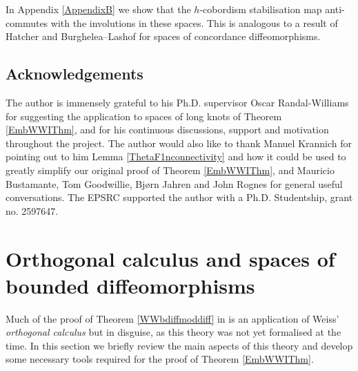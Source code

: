 \documentclass[a4paper, oneside]{amsart}
\newcommand{\1}{\mathds{1}}
\theoremstyle{remark}
\theoremstyle{definition}
\numberwithin{equation}{section}
\begin{document}
In Appendix \ref{AppendixB} we show that the $h$-cobordism stabilisation map anti-commutes with the involutions in these spaces. This is analogous to a result of Hatcher \cite[Appendix I, Lem.]{HatcherSSeq} and Burghelea--Lashof \cite[Cor. A7]{BurgLash} for spaces of concordance diffeomorphisms.





\subsection*{Acknowledgements}
The author is immensely grateful to his Ph.D. supervisor Oscar Randal-Williams for suggesting the application to spaces of long knots of Theorem \ref{EmbWWIThm}, and for his continuous discussions, support and motivation throughout the project. The author would also like to thank Manuel Krannich for pointing out to him Lemma \ref{ThetaF1nconnectivity} and how it could be used to greatly simplify our original proof of Theorem \ref{EmbWWIThm}, and Mauricio Bustamante, Tom Goodwillie, Bjørn Jahren and John Rognes for general useful conversations. The EPSRC supported the author with a Ph.D. Studentship, grant no. 2597647.







\section{Orthogonal calculus and spaces of bounded diffeomorphisms}\label{section2}
Much of the proof of Theorem \ref{WWbdiffmoddiff} in \cite{WWI} is an application of Weiss' \textit{orthogonal calculus} but in disguise, as this theory was not yet formalised at the time. In this section we briefly review the main aspects of this theory and develop some necessary tools required for the proof of Theorem \ref{EmbWWIThm}.
\end{document}
